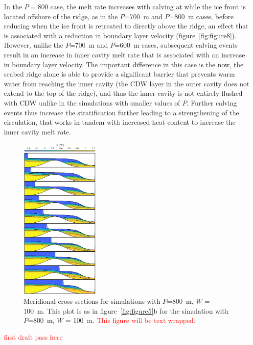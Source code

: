\documentclass[draft]{agujournal2019}
\newcommand{\red}[1]{\textcolor{red}{#1}}
\begin{document}
In the $P = 800$ case, the melt rate increases with calving at while the ice front is located offshore of the ridge, as in the $P$=700~m and $P$=800~m cases, before reducing when the ice front is retreated to directly above the ridge, an effect that is associated with a reduction in boundary layer velocity (figure~\ref{fig:figure8}). However, unlike the $P$=700~m and $P$=600~m cases, subsequent calving events result in an increase in inner cavity melt rate that is associated with an increase in boundary layer velocity. The important difference in this case is the now, the seabed ridge alone is able to provide a significant barrier that prevents warm water from reaching the inner cavity (the CDW layer in the outer cavity does not extend to the top of the ridge), and thus the inner cavity is not entirely flushed with CDW unlike in the simulations with smaller values of $P$. Further calving events thus increase the stratification further leading to a strengthening of the circulation, that works in tandem with increased heat content to increase the inner cavity melt rate.


\begin{figure}
    \centering
    \includegraphics[width = 0.35\textwidth]{../make_figures/plots/figure9.eps}
    \caption{Meridional cross sections for simulations with $P$=800~m, $W$ = 100~m. This plot is as in figure~\ref{fig:figure5}b for the simulation with $P$=800~m, $W$ = 100~m.  \red{This figure will be text wrapped.} }
    \label{fig:figure9}
\end{figure}

\red{first draft pass here}
\end{document}
